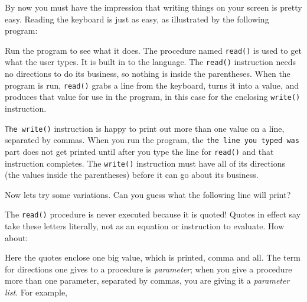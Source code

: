 By now you must have the impression that writing things on your screen
is pretty easy. Reading the keyboard is just as easy,
as illustrated by the following program:


Run the program to see what it does. The procedure named
\texttt{read()} is used to get what the user types. It is
built in to the language. The \texttt{read()} instruction needs no
directions to do its business, so nothing is inside the parentheses.
When the program is run, \texttt{read()} grabs a line from the
keyboard, turns it into a value, and produces that value for use in the
program, in this case for the enclosing \texttt{write()} instruction.

\texttt{The }\texttt{write()} instruction is happy to print out more
than one value on a line, separated by commas. When you run the
program, the \texttt{{\textquotedbl}the line you typed
was{\textquotedbl}} part does not get printed until after you type the
line for \texttt{read()} and that instruction completes. The
\texttt{write()} instruction must have all of its directions (the
values inside the parentheses) before it can go about its business.

Now let{\textquotesingle}s try some variations. Can you guess what the
following line will print?


The \texttt{read()} procedure is never executed because it is quoted!
Quotes in effect say {\textquotedbl}take these letters literally, not
as an equation or instruction to evaluate.{\textquotedbl} How about:


\noindent Here the quotes enclose one big value, which is printed, comma
and all. The term for directions one gives to a procedure is
\textit{parameter}; when you give a procedure more than one parameter,
separated by commas, you are giving it a
\textit{parameter list}. For example,

